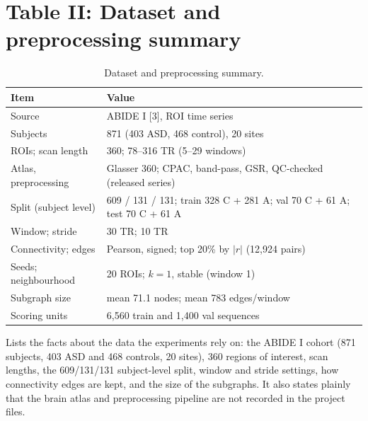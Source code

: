 \documentclass[11pt]{article}
\begin{document}
\section*{Table II: Dataset and preprocessing summary}
\begin{table}[!tbp]
\caption{Dataset and preprocessing summary.}
\label{tab:data}
\centering\footnotesize
\begin{tabular}{@{}p{2.9cm}p{5.05cm}@{}}
\toprule
Item & Value \\
\midrule
Source & ABIDE I {[3]}, ROI time series \\
Subjects & 871 (403 ASD, 468 control), 20 sites \\
ROIs; scan length & 360; 78--316 TR (5--29 windows) \\
Atlas, preprocessing & Glasser 360; CPAC, band-pass, GSR, QC-checked (released series) \\
Split (subject level) & 609 / 131 / 131; train 328 C + 281 A; val 70 C + 61 A; test 70 C + 61 A \\
Window; stride & 30 TR; 10 TR \\
Connectivity; edges & Pearson, signed; top 20\% by $|r|$ (12,924 pairs) \\
Seeds; neighbourhood & 20 ROIs; $k{=}1$, stable (window 1) \\
Subgraph size & mean 71.1 nodes; mean 783 edges/window \\
Scoring units & 6,560 train and 1,400 val sequences \\
\bottomrule
\end{tabular}
\end{table}

\smallskip
Lists the facts about the data the experiments rely on: the ABIDE I cohort (871 subjects, 403 ASD and 468 controls, 20 sites), 360 regions of interest, scan lengths, the 609/131/131 subject-level split, window and stride settings, how connectivity edges are kept, and the size of the subgraphs. It also states plainly that the brain atlas and preprocessing pipeline are not recorded in the project files.

\bigskip
\end{document}
